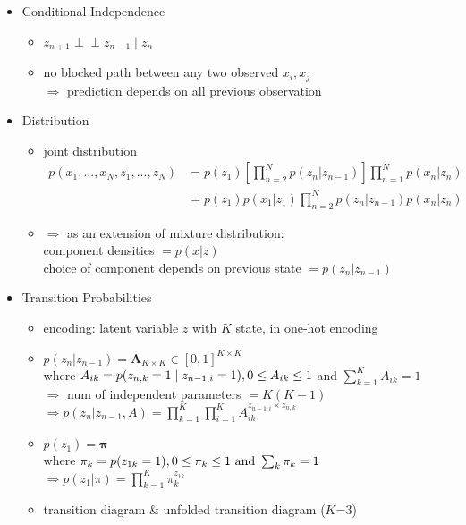 \begin{itemize}
\begin{itemize}
	\item Conditional Independence
		\begin{itemize}
		\item $z_{n+1} \perp\!\!\!\perp z_{n-1} \mid z_n$
		\item no blocked path between any two observed $x_i,x_j$ \\
		$\Rightarrow$ prediction depends on all previous observation
		\end{itemize}
	\item Distribution
		\begin{itemize}
		\item joint distribution \begin{align*} \displaystyle p(x_1,...,x_N,z_1,...,z_N) &= p(z_1)[\prod_{n=2}^N p(z_n|z_{n-1})]\prod_{n=1}^N p(x_n|z_n) \\ &= p(z_1)p(x_1|z_1)\prod_{n=2}^N p(z_n|z_{n-1}) p(x_n|z_n) \end{align*}
		\item $\Rightarrow$ as an extension of mixture distribution: \\
		component densities $=p(x|z)$ \\
		choice of component depends on previous state $=p(z_n|z_{n-1})$
		\end{itemize}
	\item Transition Probabilities
		\begin{itemize}
		\item encoding: latent variable $z$ with $K$ state, in one-hot encoding
		\item $p(z_n|z_{n-1}) = \mathbf A_{K\times K}\in [0,1]^{K\times K}$ \\
		where $A_{ik}=p(z_{n,k}=1 \mid z_{n-1,i}=1), \space 0 \le A_{ik}\le 1$ and $\sum_{k=1}^K A_{ik} = 1$ \\
		$\Rightarrow$ num of independent parameters $=K(K-1)$ \\
		$\displaystyle \Rightarrow p(z_n|z_{n-1},A) = \prod_{k=1}^K \prod_{i=1}^K A_{ik}^{z_{n-1,i} \times z_{n,k}}$
		\item $p(z_1) = \mathbf \pi$ \\
		where $\pi_k = p(z_{1k}=1), 0\le\pi_k \le 1  \text{ and } \space \sum_k \pi_k=1$ \\
		$\displaystyle \Rightarrow p(z_1|\pi) = \prod_{k=1}^K \pi_k^{z_{1k}}$
		\item transition diagram \& unfolded transition diagram ($K$=3) \\
		\begin{figure}[h]

\end{figure}
\end{itemize}
\end{itemize}
\end{itemize}
